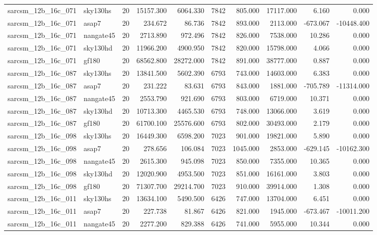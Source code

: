 \begin{longtable}{llrrrrrrrr}
sarcsm\_12b\_16c\_071 & sky130hs & 20 & 15157.300 & 6064.330 & 7842 & 805.000 & 17117.000 & 6.160 & 0.000 \\
sarcsm\_12b\_16c\_071 & asap7 & 20 & 234.672 & 86.736 & 7842 & 893.000 & 2113.000 & -673.067 & -10448.400 \\
sarcsm\_12b\_16c\_071 & nangate45 & 20 & 2713.890 & 972.496 & 7842 & 826.000 & 7538.000 & 10.286 & 0.000 \\
sarcsm\_12b\_16c\_071 & sky130hd & 20 & 11966.200 & 4900.950 & 7842 & 820.000 & 15798.000 & 4.066 & 0.000 \\
sarcsm\_12b\_16c\_071 & gf180 & 20 & 68562.800 & 28272.000 & 7842 & 891.000 & 38777.000 & 0.887 & 0.000 \\
sarcsm\_12b\_16c\_087 & sky130hs & 20 & 13841.500 & 5602.390 & 6793 & 743.000 & 14603.000 & 6.383 & 0.000 \\
sarcsm\_12b\_16c\_087 & asap7 & 20 & 231.222 & 83.631 & 6793 & 843.000 & 1881.000 & -705.789 & -11314.000 \\
sarcsm\_12b\_16c\_087 & nangate45 & 20 & 2553.790 & 921.690 & 6793 & 803.000 & 6719.000 & 10.371 & 0.000 \\
sarcsm\_12b\_16c\_087 & sky130hd & 20 & 10713.300 & 4465.530 & 6793 & 748.000 & 13066.000 & 3.619 & 0.000 \\
sarcsm\_12b\_16c\_087 & gf180 & 20 & 61700.100 & 25576.600 & 6793 & 802.000 & 30493.000 & 2.179 & 0.000 \\
sarcsm\_12b\_16c\_098 & sky130hs & 20 & 16449.300 & 6598.200 & 7023 & 901.000 & 19821.000 & 5.890 & 0.000 \\
sarcsm\_12b\_16c\_098 & asap7 & 20 & 278.656 & 106.084 & 7023 & 1045.000 & 2853.000 & -629.145 & -10162.300 \\
sarcsm\_12b\_16c\_098 & nangate45 & 20 & 2615.300 & 945.098 & 7023 & 850.000 & 7355.000 & 10.365 & 0.000 \\
sarcsm\_12b\_16c\_098 & sky130hd & 20 & 12020.900 & 4953.500 & 7023 & 851.000 & 16161.000 & 3.803 & 0.000 \\
sarcsm\_12b\_16c\_098 & gf180 & 20 & 71307.700 & 29214.700 & 7023 & 910.000 & 39914.000 & 1.308 & 0.000 \\
sarcsm\_12b\_16c\_011 & sky130hs & 20 & 13634.100 & 5490.500 & 6426 & 747.000 & 13704.000 & 6.451 & 0.000 \\
sarcsm\_12b\_16c\_011 & asap7 & 20 & 227.738 & 81.867 & 6426 & 821.000 & 1945.000 & -673.467 & -10011.200 \\
sarcsm\_12b\_16c\_011 & nangate45 & 20 & 2277.200 & 829.388 & 6426 & 741.000 & 5955.000 & 10.344 & 0.000 \\

\end{longtable}
